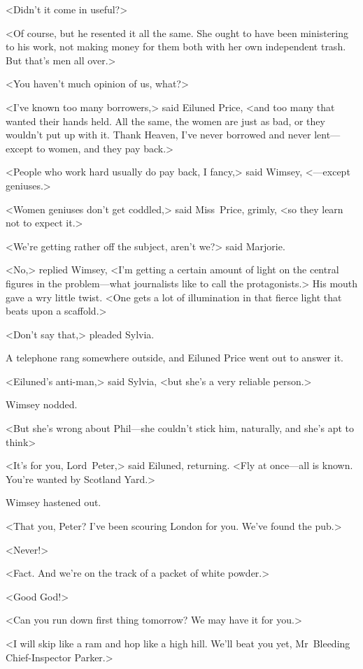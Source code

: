 <Didn't it come in useful?>

<Of course, but he resented it all the same. She ought to have been ministering to his work, not making money for them both with her own independent trash. But that's men all over.>

<You haven't much opinion of us, what?>

<I've known too many borrowers,> said Eiluned Price, <and too many that wanted their hands held. All the same, the women are just as bad, or they wouldn't put up with it. Thank Heaven, I've never borrowed and never lent—except to women, and they pay back.>

<People who work hard usually do pay back, I fancy,> said Wimsey, <—except geniuses.>

<Women geniuses don't get coddled,> said Miss~Price, grimly, <so they learn not to expect it.>

<We're getting rather off the subject, aren't we?> said Marjorie.

<No,> replied Wimsey, <I'm getting a certain amount of light on the central figures in the problem—what journalists like to call the protagonists.> His mouth gave a wry little twist. <One gets a lot of illumination in that fierce light that beats upon a scaffold.>

<Don't say that,> pleaded Sylvia.

A telephone rang somewhere outside, and Eiluned Price went out to answer it.

<Eiluned's anti-man,> said Sylvia, <but she's a very reliable person.>

Wimsey nodded.

<But she's wrong about Phil—she couldn't stick him, naturally, and she's apt to think\longdash>

<It's for you, Lord~Peter,> said Eiluned, returning. <Fly at once—all is known. You're wanted by Scotland Yard.>

Wimsey hastened out.

<That you, Peter? I've been scouring London for you. We've found the pub.>

<Never!>

<Fact. And we're on the track of a packet of white powder.>

<Good God!>

<Can you run down first thing tomorrow? We may have it for you.>

<I will skip like a ram and hop like a high hill. We'll beat you yet, Mr~Bleeding Chief-Inspector Parker.>

